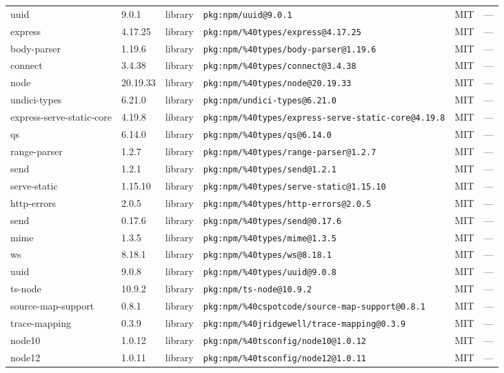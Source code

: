 \documentclass[11pt]{article}
\begin{document}
\begin{longtable}{|l|l|l|p{2.2cm}|l|p{4cm}|}
uuid & 9.0.1 & library & \texttt{pkg:npm/uuid@9.0.1} & MIT & — \\
express & 4.17.25 & library & \texttt{pkg:npm/\%40types/express@4.17.25} & MIT & — \\
body-parser & 1.19.6 & library & \texttt{pkg:npm/\%40types/body-parser@1.19.6} & MIT & — \\
connect & 3.4.38 & library & \texttt{pkg:npm/\%40types/connect@3.4.38} & MIT & — \\
node & 20.19.33 & library & \texttt{pkg:npm/\%40types/node@20.19.33} & MIT & — \\
undici-types & 6.21.0 & library & \texttt{pkg:npm/undici-types@6.21.0} & MIT & — \\
express-serve-static-core & 4.19.8 & library & \texttt{pkg:npm/\%40types/express-serve-static-core@4.19.8} & MIT & — \\
qs & 6.14.0 & library & \texttt{pkg:npm/\%40types/qs@6.14.0} & MIT & — \\
range-parser & 1.2.7 & library & \texttt{pkg:npm/\%40types/range-parser@1.2.7} & MIT & — \\
send & 1.2.1 & library & \texttt{pkg:npm/\%40types/send@1.2.1} & MIT & — \\
serve-static & 1.15.10 & library & \texttt{pkg:npm/\%40types/serve-static@1.15.10} & MIT & — \\
http-errors & 2.0.5 & library & \texttt{pkg:npm/\%40types/http-errors@2.0.5} & MIT & — \\
send & 0.17.6 & library & \texttt{pkg:npm/\%40types/send@0.17.6} & MIT & — \\
mime & 1.3.5 & library & \texttt{pkg:npm/\%40types/mime@1.3.5} & MIT & — \\
ws & 8.18.1 & library & \texttt{pkg:npm/\%40types/ws@8.18.1} & MIT & — \\
uuid & 9.0.8 & library & \texttt{pkg:npm/\%40types/uuid@9.0.8} & MIT & — \\
ts-node & 10.9.2 & library & \texttt{pkg:npm/ts-node@10.9.2} & MIT & — \\
source-map-support & 0.8.1 & library & \texttt{pkg:npm/\%40cspotcode/source-map-support@0.8.1} & MIT & — \\
trace-mapping & 0.3.9 & library & \texttt{pkg:npm/\%40jridgewell/trace-mapping@0.3.9} & MIT & — \\
node10 & 1.0.12 & library & \texttt{pkg:npm/\%40tsconfig/node10@1.0.12} & MIT & — \\
node12 & 1.0.11 & library & \texttt{pkg:npm/\%40tsconfig/node12@1.0.11} & MIT & — \\

\end{longtable}
\end{document}
